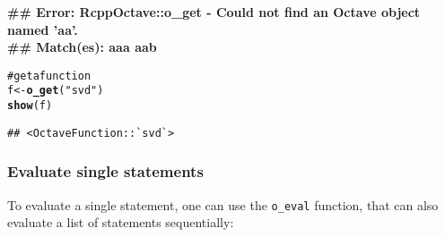 \documentclass[english,10pt,a4paper]{article}\usepackage{graphicx, color}
\makeatletter
\newcommand{\hlfunctioncall}[1]{\textcolor[rgb]{0.501960784313725,0,0.329411764705882}{\textbf{#1}}}%
\newcommand{\hlstring}[1]{\textcolor[rgb]{0.6,0.6,1}{#1}}%
\newcommand{\hlcomment}[1]{\textcolor[rgb]{0.180392156862745,0.6,0.341176470588235}{#1}}%
\newenvironment{kframe}{%
 \def\at@end@of@kframe{}%
 \ifinner\ifhmode%
  \def\at@end@of@kframe{\end{minipage}}%
  \begin{minipage}{\columnwidth}%
 \fi\fi%
 \def\FrameCommand##1{\hskip\@totalleftmargin \hskip-\fboxsep
 \colorbox{shadecolor}{##1}\hskip-\fboxsep
     \hskip-\linewidth \hskip-\@totalleftmargin \hskip\columnwidth}%
 \MakeFramed {\advance\hsize-\width
   \@totalleftmargin\z@ \linewidth\hsize
   \@setminipage}}%
 {\par\unskip\endMakeFramed%
 \at@end@of@kframe}
\newenvironment{knitrout}{}{} %
\let\code=\texttt
\makeatother
\begin{document}
\begin{knitrout}
\begin{kframe}
{\ttfamily\noindent\bfseries\textcolor{errorcolor}{\#\# Error: RcppOctave::o\_get - Could not find an Octave object named 'aa'.\\\#\#        Match(es): aaa aab}}\begin{alltt}
\hlcomment{# get a function}
f <- \hlfunctioncall{o_get}(\hlstring{"svd"})
\hlfunctioncall{show}(f)
\end{alltt}
\begin{verbatim}
## <OctaveFunction::`svd`>
\end{verbatim}
\end{kframe}
\end{knitrout}


\subsubsection{Evaluate single statements}

To evaluate a single statement, one can use the \code{o\_eval} function, that
can also evaluate a list of statements sequentially:
\end{document}
